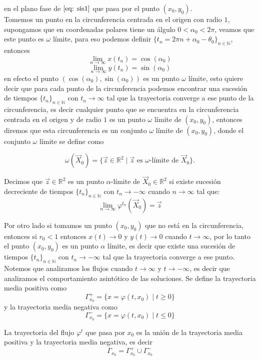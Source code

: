 en el plano fase de $\eqref{eq: sis1}$ que pasa por el punto
$(x_0,y_0)$.\\

Tomemos un punto en la circunferencia centrada en el origen con radio $1$,
supongamos que
en coordenadas polares tiene un álgulo $0<\alpha_0<2\pi$, veamos que este punto es $\omega$ límite, para eso podemos definir
$\{t_n=2\pi n+\alpha_0-\theta_0\}_{n\in \mathbb{N}}$, entonces
$$\lim_{n\to\infty}x(t_n)=\cos(\alpha_0)$$
$$\lim_{n\to\infty}y(t_n)=\sin(\alpha_0)$$
en efecto el punto $(\cos(\alpha_0),\sin(\alpha_0))$ es un punto $\omega$ límite, esto
quiere decir que para cada punto de la circunferencia podemos encontrar
una sucesión de tiempos $\{t_n\}_{n\in \mathbb{N}}$ con $t_n\to\infty$ tal que la
trayectoria converge a ese punto de la circunferencia, es decir cualquier punto que se encuentra en la
circunferencia centrada en el origen y de radio $1$ es un punto $\omega$ límite de $(x_0,y_0)$,
entonces diremos que esta circunferencia es un conjunto $\omega$ límite de $(x_0,y_0)$, donde
el conjunto $\omega$ límite se define como

$$\omega(\vec{X}_0)=\{\vec{z}\in\mathbb{R}^2\mid\vec{z} \text{  es  } \omega\text{-límite de  } \vec{X}_0\}.$$

\begin{definition}
	Decimos que $\vec{z}\in\mathbb{R}^2$ es un punto $\alpha$-límite
	de $\vec{X}_0\in\mathbb{R}^2$ si existe sucesión decreciente de
	tiempos $\{t_n\}_{n\in\mathbb{N}}$
	con $t_n \to-\infty$ cuando $n\to \infty$ tal que:
	$$\lim_{n\to\infty}\varphi^{t_n}(\vec{X}_0)=\vec{z}$$
\end{definition}

Por otro lado si tomamos un punto $(x_0,y_0)$ que no está en la circunferencia, entonces si  $r_0<1$ entonces $x(t)\to 0$ y $y(t)\to 0$ cuando $t\to\infty$, por lo tanto el punto $(x_0,y_0)$ es un punto $\alpha$ límite, es decir que existe una sucesión de tiempos $\{t_n\}_{n\in \mathbb{N}}$ con $t_n\to-\infty$ tal que la trayectoria converge a ese punto.\\

Notemos que analizamos los flujos cuando $t\to\infty$ y $t\to-\infty$, es decir que analizamos el comportamiento asintótico de las soluciones. Se define la trayectoria media positiva como
$$\varGamma_{x_0}^{+}=\{x=\varphi(t,x_0)\mid t\geq0\}$$
y la trayectoria media negativa como
$$\varGamma_{x_0}^{-}=\{x=\varphi(t,x_0)\mid t\leq0\}$$

La trayectoria del flujo $\varphi^t$ que pasa por $x_0$ es la unión de la trayectoria media positiva y la trayectoria media negativa, es decir
$$\varGamma_{x_0}=\varGamma_{x_0}^{+}\cup\varGamma_{x_0}^{-}$$






